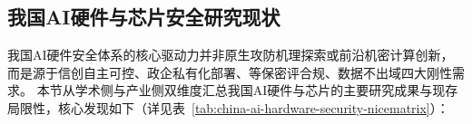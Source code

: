 



\subsection{我国AI硬件与芯片安全研究现状}
我国AI硬件安全体系的核心驱动力并非原生攻防机理探索或前沿机密计算创新，而是源于信创自主可控、政企私有化部署、等保密评合规、数据不出域四大刚性需求。
本节从学术侧与产业侧双维度汇总我国AI硬件与芯片的主要研究成果与现存局限性，核心发现如下（详见表~\ref{tab:china-ai-hardware-security-nicematrix}）：

